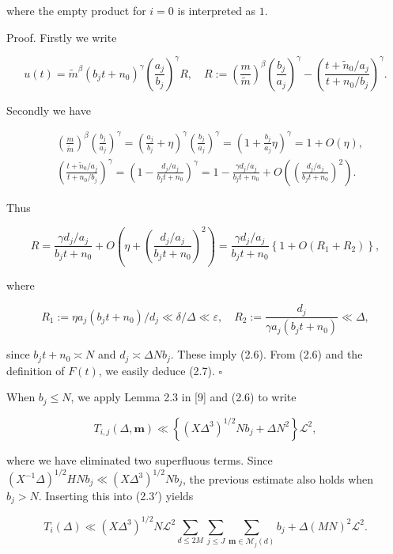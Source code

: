 \documentclass[10pt]{article}
\begin{document}
where the empty product for $i=0$ is interpreted as $1$.

Proof. Firstly we write

$$
u(t)=\tilde{m}^{\beta}\left(b_{j} t+n_{0}\right)^{\gamma}\left(\frac{a_{j}}{b_{j}}\right)^{\gamma} R, \quad R:=\left(\frac{m}{\tilde{m}}\right)^{\beta}\left(\frac{b_{j}}{a_{j}}\right)^{\gamma}-\left(\frac{t+\tilde{n}_{0} / a_{j}}{t+n_{0} / b_{j}}\right)^{\gamma} .
$$

Secondly we have

$$
\begin{aligned}
& \left(\frac{m}{\tilde{m}}\right)^{\beta}\left(\frac{b_{j}}{a_{j}}\right)^{\gamma}=\left(\frac{a_{j}}{b_{j}}+\eta\right)^{\gamma}\left(\frac{b_{j}}{a_{j}}\right)^{\gamma}=\left(1+\frac{b_{j}}{a_{j}} \eta\right)^{\gamma}=1+O(\eta), \\
& \left(\frac{t+\tilde{n}_{0} / a_{j}}{t+n_{0} / b_{j}}\right)^{\gamma}=\left(1-\frac{d_{j} / a_{j}}{b_{j} t+n_{0}}\right)^{\gamma}=1-\frac{\gamma d_{j} / a_{j}}{b_{j} t+n_{0}}+O\left(\left(\frac{d_{j} / a_{j}}{b_{j} t+n_{0}}\right)^{2}\right) .
\end{aligned}
$$

Thus

$$
R=\frac{\gamma d_{j} / a_{j}}{b_{j} t+n_{0}}+O\left(\eta+\left(\frac{d_{j} / a_{j}}{b_{j} t+n_{0}}\right)^{2}\right)=\frac{\gamma d_{j} / a_{j}}{b_{j} t+n_{0}}\left\{1+O\left(R_{1}+R_{2}\right)\right\},
$$

where

$$
R_{1}:=\eta a_{j}\left(b_{j} t+n_{0}\right) / d_{j} \ll \delta / \Delta \ll \varepsilon, \quad R_2:=\frac{d_j}{\gamma a_j(b_jt+n_0)} \ll \Delta,
$$

since $b_{j} t+n_{0} \asymp N$ and $d_{j} \asymp \Delta N b_{j}$. These imply (2.6). From (2.6) and the definition of $F(t)$, we easily deduce (2.7). \(\square\)

When $b_{j} \leqslant N$, we apply Lemma 2.3 in [9] and (2.6) to write

$$
T_{i, j}(\Delta, \mathbf{m}) \ll\left\{\left(X \Delta^{3}\right)^{1 / 2} N b_{j}+\Delta N^{2}\right\} \mathscr{L}^{2},
$$

where we have eliminated two superfluous terms. Since $\left(X^{-1} \Delta\right)^{1 / 2} H N b_{j} \ll \left(X \Delta^{3}\right)^{1 / 2} N b_{j}$, the previous estimate also holds when $b_{j}>N$. Inserting this into (2.3$'$) yields

$$
T_{i}(\Delta) \ll\left(X \Delta^{3}\right)^{1 / 2} N \mathscr{L}^{2} \sum_{d \leqslant 2 M} \sum_{j \leqslant J} \sum_{\mathbf{m} \in \mathscr{M}_{j}(d)} b_{j}+\Delta(M N)^{2} \mathscr{L}^{2} .
$$
\end{document}
